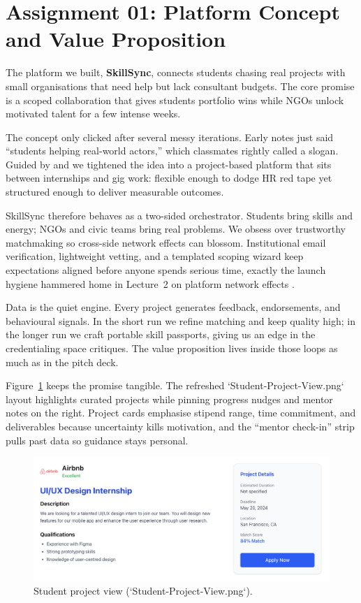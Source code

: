 \section*{Assignment 01: Platform Concept and Value Proposition}

The platform we built, \textbf{SkillSync}, connects students chasing real projects with small organisations that need help but lack consultant budgets. The core promise is a scoped collaboration that gives students portfolio wins while NGOs unlock motivated talent for a few intense weeks.

The concept only clicked after several messy iterations. Early notes just said ``students helping real-world actors,'' which classmates rightly called a slogan. Guided by \citet{Choudary2016} and \citet{Srnicek2017} we tightened the idea into a project-based platform that sits between internships and gig work: flexible enough to dodge HR red tape yet structured enough to deliver measurable outcomes.

SkillSync therefore behaves as a two-sided orchestrator. Students bring skills and energy; NGOs and civic teams bring real problems. We obsess over trustworthy matchmaking so cross-side network effects can blossom. Institutional email verification, lightweight vetting, and a templated scoping wizard keep expectations aligned before anyone spends serious time, exactly the launch hygiene hammered home in Lecture~2 on platform network effects \citep{Lecture02}.

Data is the quiet engine. Every project generates feedback, endorsements, and behavioural signals. In the short run we refine matching and keep quality high; in the longer run we craft portable skill passports, giving us an edge in the credentialing space \citet{Zuboff2019} critiques. The value proposition lives inside those loops as much as in the pitch deck.

Figure~\ref{fig:student-view} keeps the promise tangible. The refreshed `Student-Project-View.png` layout highlights curated projects while pinning progress nudges and mentor notes on the right. Project cards emphasise stipend range, time commitment, and deliverables because uncertainty kills motivation, and the ``mentor check-in'' strip pulls past data so guidance stays personal.

\begin{figure}[h]
  \centering
  \includegraphics[width=0.85\linewidth]{figures/Student-Project-View.png}
  \caption{Student project view (`Student-Project-View.png`).}
  \label{fig:student-view}
\end{figure}


